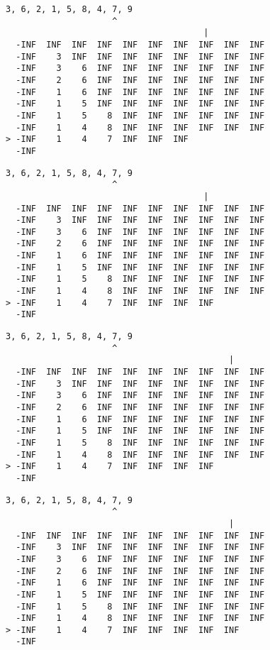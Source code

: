 { \begin{verbatim}
3, 6, 2, 1, 5, 8, 4, 7, 9
                     ^
                                       |
  -INF  INF  INF  INF  INF  INF  INF  INF  INF  INF
  -INF    3  INF  INF  INF  INF  INF  INF  INF  INF
  -INF    3    6  INF  INF  INF  INF  INF  INF  INF
  -INF    2    6  INF  INF  INF  INF  INF  INF  INF
  -INF    1    6  INF  INF  INF  INF  INF  INF  INF
  -INF    1    5  INF  INF  INF  INF  INF  INF  INF
  -INF    1    5    8  INF  INF  INF  INF  INF  INF
  -INF    1    4    8  INF  INF  INF  INF  INF  INF
> -INF    1    4    7  INF  INF  INF               
  -INF                                             
\end{verbatim} }

{ \begin{verbatim}
3, 6, 2, 1, 5, 8, 4, 7, 9
                     ^
                                       |
  -INF  INF  INF  INF  INF  INF  INF  INF  INF  INF
  -INF    3  INF  INF  INF  INF  INF  INF  INF  INF
  -INF    3    6  INF  INF  INF  INF  INF  INF  INF
  -INF    2    6  INF  INF  INF  INF  INF  INF  INF
  -INF    1    6  INF  INF  INF  INF  INF  INF  INF
  -INF    1    5  INF  INF  INF  INF  INF  INF  INF
  -INF    1    5    8  INF  INF  INF  INF  INF  INF
  -INF    1    4    8  INF  INF  INF  INF  INF  INF
> -INF    1    4    7  INF  INF  INF  INF          
  -INF                                             
\end{verbatim} }

{ \begin{verbatim}
3, 6, 2, 1, 5, 8, 4, 7, 9
                     ^
                                            |
  -INF  INF  INF  INF  INF  INF  INF  INF  INF  INF
  -INF    3  INF  INF  INF  INF  INF  INF  INF  INF
  -INF    3    6  INF  INF  INF  INF  INF  INF  INF
  -INF    2    6  INF  INF  INF  INF  INF  INF  INF
  -INF    1    6  INF  INF  INF  INF  INF  INF  INF
  -INF    1    5  INF  INF  INF  INF  INF  INF  INF
  -INF    1    5    8  INF  INF  INF  INF  INF  INF
  -INF    1    4    8  INF  INF  INF  INF  INF  INF
> -INF    1    4    7  INF  INF  INF  INF          
  -INF                                             
\end{verbatim} }

{ \begin{verbatim}
3, 6, 2, 1, 5, 8, 4, 7, 9
                     ^
                                            |
  -INF  INF  INF  INF  INF  INF  INF  INF  INF  INF
  -INF    3  INF  INF  INF  INF  INF  INF  INF  INF
  -INF    3    6  INF  INF  INF  INF  INF  INF  INF
  -INF    2    6  INF  INF  INF  INF  INF  INF  INF
  -INF    1    6  INF  INF  INF  INF  INF  INF  INF
  -INF    1    5  INF  INF  INF  INF  INF  INF  INF
  -INF    1    5    8  INF  INF  INF  INF  INF  INF
  -INF    1    4    8  INF  INF  INF  INF  INF  INF
> -INF    1    4    7  INF  INF  INF  INF  INF     
  -INF                                             
\end{verbatim} }

